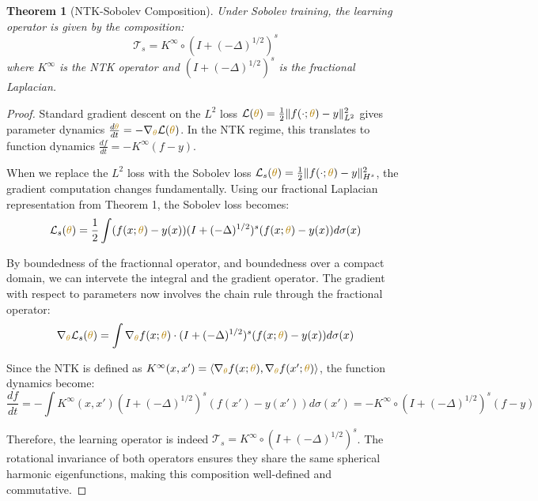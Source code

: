 \documentclass[a4paper]{article}
\theoremstyle{plain}
\newtheorem{theorem}{Theorem}[section]
\theoremstyle{definition}
\theoremstyle{remark}
\begin{document}
\begin{theorem}[NTK-Sobolev Composition]
Under Sobolev training, the learning operator is given by the composition:
\[ \mathcal{T}_s = K^{\infty} \circ (I + (-\Delta)^{1/2})^s \]
where $K^{\infty}$ is the NTK operator and $(I + (-\Delta)^{1/2})^s$ is the fractional Laplacian.
\end{theorem}

\begin{proof}
Standard gradient descent on the $L^2$ loss $\mathcal{L}(\textcolor{darkyellow}{\theta}) = \frac{1}{2}\|f(\cdot; \textcolor{darkyellow}{\theta}) - y\|^2_{L^2}$ gives parameter dynamics $\frac{d\textcolor{darkyellow}{\theta}}{dt} = -\nabla_{\textcolor{darkyellow}{\theta}} \mathcal{L}(\textcolor{darkyellow}{\theta})$. In the NTK regime, this translates to function dynamics $\frac{df}{dt} = -K^{\infty}(f - y)$.

When we replace the $L^2$ loss with the Sobolev loss $\mathcal{L}_s(\textcolor{darkyellow}{\theta}) = \frac{1}{2}\|f(\cdot; \textcolor{darkyellow}{\theta}) - y\|^2_{H^s}$, the gradient computation changes fundamentally. Using our fractional Laplacian representation from Theorem 1, the Sobolev loss becomes:
\[ \mathcal{L}_s(\textcolor{darkyellow}{\theta}) = \frac{1}{2}\int (f(x; \textcolor{darkyellow}{\theta}) - y(x)) (I + (-\Delta)^{1/2})^s (f(x; \textcolor{darkyellow}{\theta}) - y(x)) d\sigma(x) \]

By boundedness of the fractionnal operator, and boundedness over a compact domain, we can intervete the integral and the gradient operator.
The gradient with respect to parameters now involves the chain rule through the fractional operator:
\[ \nabla_{\textcolor{darkyellow}{\theta}} \mathcal{L}_s(\textcolor{darkyellow}{\theta}) = \int \nabla_{\textcolor{darkyellow}{\theta}} f(x; \textcolor{darkyellow}{\theta}) \cdot (I + (-\Delta)^{1/2})^s (f(x; \textcolor{darkyellow}{\theta}) - y(x)) d\sigma(x) \]

Since the NTK is defined as $K^{\infty}(x, x') = \langle \nabla_{\textcolor{darkyellow}{\theta}} f(x; \textcolor{darkyellow}{\theta}), \nabla_{\textcolor{darkyellow}{\theta}} f(x'; \textcolor{darkyellow}{\theta}) \rangle$, the function dynamics become:
\[ \frac{df}{dt} = -\int K^{\infty}(x, x') (I + (-\Delta)^{1/2})^s (f(x') - y(x')) d\sigma(x') = -K^{\infty} \circ (I + (-\Delta)^{1/2})^s (f - y) \]

Therefore, the learning operator is indeed $\mathcal{T}_s = K^{\infty} \circ (I + (-\Delta)^{1/2})^s$. The rotational invariance of both operators ensures they share the same spherical harmonic eigenfunctions, making this composition well-defined and commutative.
\end{proof}
\end{document}
